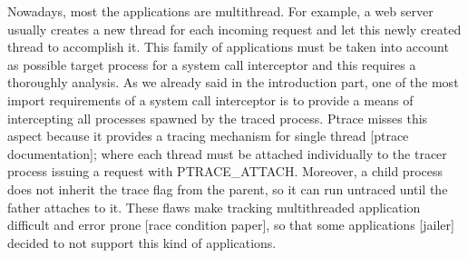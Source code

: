Nowadays, most the applications are multithread. For example, a web server usually creates a new thread for each incoming request and let this newly created thread to accomplish it. This family of applications must be taken into account as possible target process for a system call interceptor and this requires a thoroughly analysis. As we already said in the introduction part, one of the most import requirements of a system call interceptor is to provide a means of intercepting all processes spawned by the traced process. Ptrace misses this aspect because it provides a tracing mechanism for single thread [ptrace documentation]; where each thread must be attached individually to the tracer process issuing a request with PTRACE\_ATTACH. Moreover, a child process does not inherit the trace flag from the parent, so it can run untraced until the father attaches to it. These flaws make tracking multithreaded application difficult and error prone [race condition paper], so that some applications [jailer] decided to not support this kind of applications.

